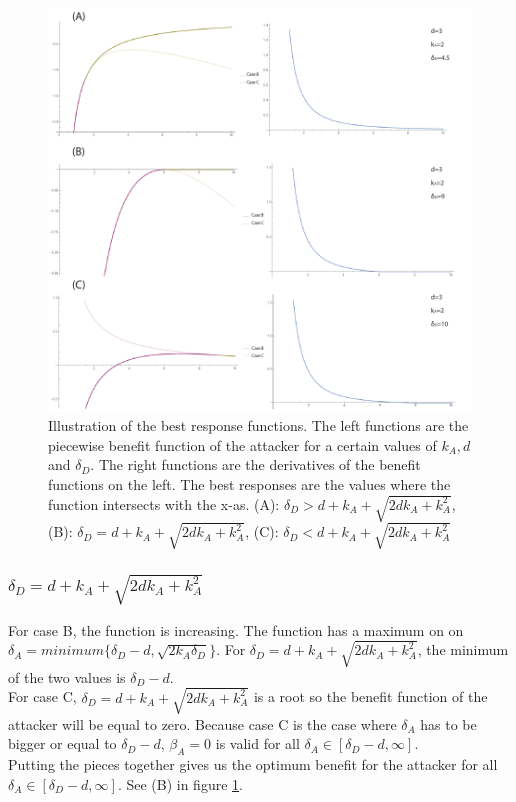 \begin{figure}[hbtp]
\centering
\includegraphics[scale=1]{Images/case1A.pdf}
\caption{ Illustration of the best response functions. The left functions are the piecewise benefit function of the attacker for a certain values of $k_{A},d$ and $\delta_{D}$. The right functions are the derivatives of the benefit functions on the left. The best responses are the values where the function intersects with the x-as. (A): $\delta_{D} > d+k_{A} + \sqrt{2dk_{A}+k_{A}^{2}}$, (B): $\delta_{D} = d+k_{A} + \sqrt{2dk_{A}+k_{A}^{2}}$, (C): $\delta_{D} < d+k_{A} + \sqrt{2dk_{A}+k_{A}^{2}}$}
\label{case1A}
\end{figure}

\subsubsection*{$\delta_{D} = d+k_{A} + \sqrt{2dk_{A}+k_{A}^{2}}$} 
For case B, the function is increasing. The function has a maximum on on $\delta_{A} = minimum \{\delta_{D} -d, \sqrt{2k_{A}\delta_{D}} \} $. For $\delta_{D} = d+k_{A} + \sqrt{2dk_{A}+k_{A}^{2}}$, the minimum of the two values is $\delta_{D}-d$.\\
For case C, $\delta_{D} = d+k_{A} + \sqrt{2dk_{A}+k_{A}^{2}}$ is a root so the benefit function of the attacker will be equal to zero. Because case C is the case where $\delta_{A}$ has to be bigger or equal to $\delta_{D}-d$, $\beta_{A}=0$ is valid for all $\delta_{A} \in [\delta_{D}-d,\infty]$.\\
Putting the pieces together gives us the optimum benefit for the attacker for all $\delta_{A} \in [\delta_{D}-d,\infty]$. See (B) in figure \ref{case1A}.


